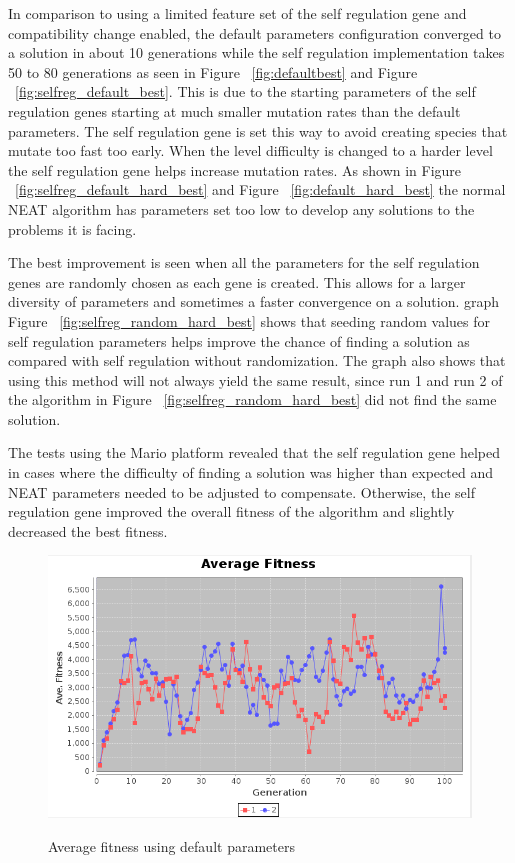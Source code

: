 \documentclass[12pt]{ucthesis} \newif\ifpdf \ifx\pdfoutput\undefined
\begin{document}
In comparison to using a limited feature set of the self regulation gene and
compatibility change enabled, the default parameters configuration converged to
a solution in about 10 generations while the self regulation implementation takes 50 to 80
generations as seen in Figure ~\ref{fig:defaultbest} and 
Figure ~\ref{fig:selfreg_default_best}. This is due to the starting parameters of the
self regulation genes starting at much smaller mutation rates than the default
parameters. The self regulation gene is set this way to avoid creating species
that mutate too fast too early.
When the level difficulty is changed to a harder level the self regulation gene
helps increase mutation rates. As shown in 
Figure ~\ref{fig:selfreg_default_hard_best} and Figure ~\ref{fig:default_hard_best} the normal
NEAT algorithm has parameters set too low to develop any solutions to the
problems it is facing.

The best improvement is seen when all the parameters for the self regulation
genes are randomly chosen as each gene is created. This allows for a larger
diversity of parameters and sometimes a faster convergence on a solution. graph
Figure ~\ref{fig:selfreg_random_hard_best} shows that seeding random values for self
regulation parameters helps improve the chance of finding a solution as compared
with self regulation without randomization. The graph also shows that using this
method will not always yield the same result, since run 1 and run 2 of the
algorithm in Figure ~\ref{fig:selfreg_random_hard_best} did not find the same solution.

The tests using the Mario platform revealed that the self regulation gene helped
in cases where the difficulty of finding a solution was higher than expected and
NEAT parameters needed to be adjusted to compensate. Otherwise, the self
regulation gene improved the overall fitness of the algorithm and slightly
decreased the best fitness.

\begin{figure}[h!]
  \caption{Average fitness using default parameters}
  \centering
    \includegraphics[width=1\textwidth]{graphsone/defaultave.png}
   \label{fig:defaultave} 
\end{figure}
\end{document}
